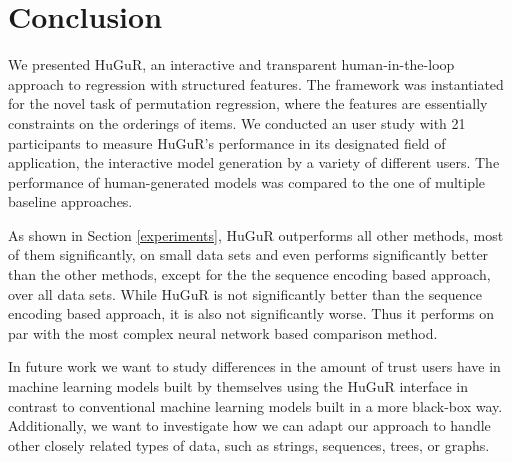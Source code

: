 

\section{Conclusion}
\label{conclusion}
We presented HuGuR, an interactive and transparent human-in-the-loop approach to
regression with structured features. The framework was instantiated for the novel task of permutation regression, where the features are essentially constraints on the orderings of items. 
We conducted an user study with 21 participants to measure HuGuR's performance in its designated field of application, the interactive model generation by a variety of different users. The performance of human-generated models was compared to the one of multiple baseline approaches.

As shown in Section \ref{experiments}, HuGuR outperforms all other methods, most of them significantly, on small data sets and even performs significantly better than the other methods, except for the the sequence encoding based approach, over all data sets. While HuGuR is not significantly better than the sequence encoding based approach, it is also not significantly worse. Thus it performs on par with the most complex neural network based comparison method.

In future work we want to study differences in the amount of trust users have in machine learning models built by themselves using the HuGuR interface in contrast to conventional machine learning models built in a more black-box way. Additionally, we want to investigate how we can adapt our approach to handle other closely related types of data, such as strings, sequences, trees, or graphs.
